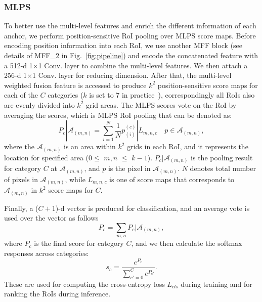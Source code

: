 \subsubsection{MLPS}
\label{MLPS}
To better use the multi-level features and enrich the different information of each anchor, we perform position-sensitive RoI pooling over MLPS score maps. Before encoding position information into each RoI, we use another MFF block (see details of MFF\_2 in Fig.~\ref{fig:pipeline}) and encode the concatenated feature with a 512-d 1$\times$1 Conv. layer to combine the multi-level features. We then attach a 256-d 1$\times$1 Conv. layer for reducing dimension.
After that, the multi-level weighted fusion feature is accessed to produce $k^2$ position-sensitive score maps for each of the $C$ categories ($k$ is set to 7 in practice~\cite{RenHGS15}), correspondingly all RoIs also are evenly divided into $k^2$ grid areas. The MLPS scores vote on the RoI by averaging the scores, which is MLPS RoI pooling that can be denoted as:
\begin{equation}
P_{c}|\mathcal{A}_{(m,n)}=\sum_{i=1}^{N} \frac{1}{N}p_{(i)}^{(c)}|L_{m,n,c} \quad p\in \mathcal{A}_{(m,n)},
\end{equation}
where the $\mathcal{A}_{(m,n)}$ is an area within $k^2$ grids in each RoI, and it represents the location for specified area (0$\leq$ $m,n$ $\leq$  $k-1$). $P_{c}|\mathcal{A}_{(m,n)}$ is the pooling result for category $C$ at $\mathcal{A}_{(m,n)}$, and $p$ is the pixel in $\mathcal{A}_{(m,n)}$. $N$ denotes total number of pixels in $\mathcal{A}_{(m,n)}$, while $L_{m,n,c}$ is one of score maps that corresponds to $\mathcal{A}_{(m,n)}$ in $k^2$ score maps for $C$.

Finally, a ($C+1$)-d vector is produced for classification, and an average vote is used over the vector as follows
\begin{equation}
P_{c}= \sum _{m,n} P_{c}|\mathcal{A}_{(m,n)},
\end{equation}
where $P_{c}$ is the final score for category $C$, and we then calculate the softmax responses across categories:
\begin{equation}
s_c=\frac{e^{P_{c}}}{\sum_{c'=0}^{C} e^{P_{c'}}}.
\end{equation}
These are used for computing the cross-entropy loss $L_{cls}$ during training and for ranking the RoIs during inference.

